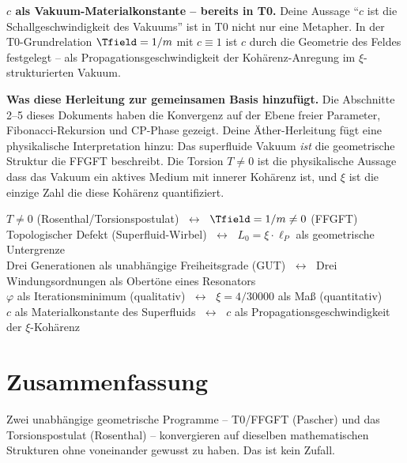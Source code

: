 \begin{response}
\medskip
\textbf{$c$ als Vakuum-Materialkonstante -- bereits in T0.}
Deine Aussage ``$c$ ist die Schallgeschwindigkeit des Vakuums'' ist in T0 nicht nur eine Metapher. In der T0-Grundrelation $\Tfield = 1/m$ mit $c \equiv 1$ ist $c$ durch die Geometrie des Feldes festgelegt -- als Propagationsgeschwindigkeit der Kohärenz-Anregung im $\xi$-strukturierten Vakuum.

\medskip
\textbf{Was diese Herleitung zur gemeinsamen Basis hinzufügt.}
Die Abschnitte 2--5 dieses Dokuments haben die Konvergenz auf der Ebene freier Parameter, Fibonacci-Rekursion und CP-Phase gezeigt. Deine Äther-Herleitung fügt eine physikalische Interpretation hinzu: Das superfluide Vakuum \emph{ist} die geometrische Struktur die FFGFT beschreibt. Die Torsion $T \neq 0$ ist die physikalische Aussage dass das Vakuum ein aktives Medium mit innerer Kohärenz ist, und $\xi$ ist die einzige Zahl die diese Kohärenz quantifiziert.

\begin{foundation}
\centering
$T \neq 0$ (Rosenthal/Torsionspostulat) $\;\longleftrightarrow\;$ $\Tfield = 1/m \neq 0$ (FFGFT)\\[0.3em]
Topologischer Defekt (Superfluid-Wirbel) $\;\longleftrightarrow\;$ $L_0 = \xi \cdot \ell_P$ als geometrische Untergrenze\\[0.3em]
Drei Generationen als unabhängige Freiheitsgrade (GUT) $\;\longleftrightarrow\;$ Drei Windungsordnungen als Obertöne eines Resonators\\[0.3em]
$\varphi$ als Iterationsminimum (qualitativ) $\;\longleftrightarrow\;$ $\xi = 4/30000$ als Maß (quantitativ)\\[0.3em]
$c$ als Materialkonstante des Superfluids $\;\longleftrightarrow\;$ $c$ als Propagationsgeschwindigkeit der $\xi$-Kohärenz
\end{foundation}
\end{response}

\section{Zusammenfassung}

Zwei unabhängige geometrische Programme -- T0/FFGFT (Pascher) und das Torsionspostulat (Rosenthal) -- konvergieren auf dieselben mathematischen Strukturen ohne voneinander gewusst zu haben. Das ist kein Zufall.

